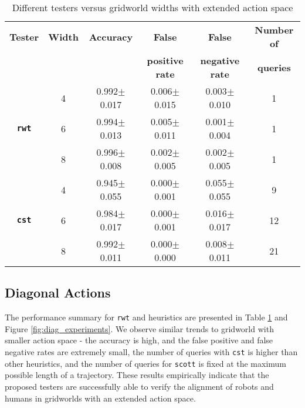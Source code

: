 \begin{table}[!hbtp]
    
  \caption{Different testers versus gridworld widths with extended action space}
  \label{tab:diag}
  \centering
  \begin{tabular}{cccccc}
    \toprule
    \textbf{Tester}& \textbf{Width}& \textbf{Accuracy} & \textbf{False} & \textbf{False} & \textbf{Number of} \\
    & & & \textbf{positive rate} & \textbf{negative rate} & \textbf{queries} \\
    \midrule
    & 4 & 0.992$\pm$0.017&	0.006$\pm$0.015&	0.003$\pm$0.010&	1\\
    \textbf{\texttt{rwt}} & 6 & 0.994$\pm$0.013&	0.005$\pm$0.011&	0.001$\pm$0.004&	1\\
    & 8 & 0.996$\pm$0.008&	0.002$\pm$0.005&	0.002$\pm$0.005&	1\\
    \midrule
    & 4 & 0.945$\pm$0.055&	0.000$\pm$0.001&	0.055$\pm$0.055&	9\\
    \textbf{\texttt{cst}} & 6 & 0.984$\pm$0.017&	0.000$\pm$0.001&	0.016$\pm$0.017&	12\\
    & 8 & 0.992$\pm$0.011&	0.000$\pm$0.000&	0.008$\pm$0.011&	21\\
    \bottomrule
  \end{tabular}
\end{table}
\subsection{Diagonal Actions}
\label{subsec:diagonal-actions}
The performance summary for \texttt{rwt} and heuristics are presented in Table \ref{tab:diag} and Figure \ref{fig:diag_experiments}. We observe similar trends to gridworld with smaller action space - the accuracy is high, and the false positive and false negative rates are extremely small, the number of queries with \texttt{cst} is higher than other heuristics, and the number of queries for \texttt{scott} is fixed at the maximum possible length of a trajectory. These results empirically indicate that the proposed testers are successfully able to verify the alignment of robots and humans in gridworlds with an extended action space.


